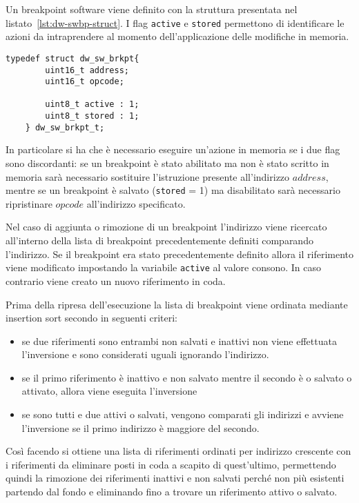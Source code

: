 Un breakpoint software viene definito con la struttura presentata nel listato~\ref{lst:dw-swbp-struct}. I flag \texttt{active} e \texttt{stored} permettono di identificare le azioni da intraprendere al momento dell'applicazione delle modifiche in memoria.

\noindent\begin{minipage}{\textwidth}
    \begin{lstlisting}[style=C, caption={Struttura utilizzata per il salvataggio dei riferimenti ai breakpoint software}, label=lst:dw-swbp-struct]
    typedef struct dw_sw_brkpt{
        uint16_t address;
        uint16_t opcode;

        uint8_t active : 1;
        uint8_t stored : 1;
    } dw_sw_brkpt_t;
    \end{lstlisting}
\end{minipage}

In particolare si ha che è necessario eseguire un'azione in memoria se i due flag sono discordanti: se un breakpoint è stato abilitato ma non è stato scritto in memoria sarà necessario sostituire l'istruzione presente all'indirizzo \(address\), mentre se un breakpoint è salvato (\texttt{stored} = 1) ma disabilitato sarà necessario ripristinare \(opcode\) all'indirizzo specificato.

Nel caso di aggiunta o rimozione di un breakpoint l'indirizzo viene ricercato all'interno della lista di breakpoint precedentemente definiti comparando l'indirizzo. Se il breakpoint era stato precedentemente definito allora il riferimento viene modificato impostando la variabile \texttt{active} al valore consono. In caso contrario viene creato un nuovo riferimento in coda.

Prima della ripresa dell'esecuzione la lista di breakpoint viene ordinata mediante insertion sort secondo in seguenti criteri:
\begin{itemize}
    \item se due riferimenti sono entrambi non salvati e inattivi non viene effettuata l'inversione e sono considerati uguali ignorando l'indirizzo.
    \item se il primo riferimento è inattivo e non salvato mentre il secondo è o salvato o attivato, allora viene eseguita l'inversione
    \item se sono tutti e due attivi o salvati, vengono comparati gli indirizzi e avviene l'inversione se il primo indirizzo è maggiore del secondo.
\end{itemize}

Così facendo si ottiene una lista di riferimenti ordinati per indirizzo crescente con i riferimenti da eliminare posti in coda a scapito di quest'ultimo, permettendo quindi la rimozione dei riferimenti inattivi e non salvati perché non più esistenti partendo dal fondo e eliminando fino a trovare un riferimento attivo o salvato.

